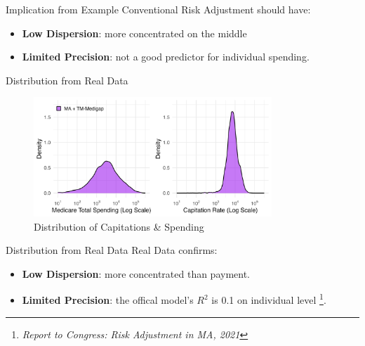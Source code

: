 \begin{frame}{Implication from Example}
    Conventional Risk Adjustment should have:
    \begin{itemize}
        \item \textbf{Low Dispersion}: more concentrated on the middle
        \item \textbf{Limited Precision}: not a good predictor for individual spending.
    \end{itemize}
\end{frame}
\begin{frame}[label=distribution]{Distribution from Real Data}
    \begin{figure}
        \centering
        \includegraphics[width=0.8\textwidth]{figures/images/capitation_spending_distribution_ungrouped.png}
        \caption{Distribution of Capitations \& Spending}
    \end{figure}
\end{frame}

\begin{frame}[label=example_end]{Distribution from Real Data}
    Real Data confirms:
    \begin{itemize}
        \item \textbf{Low Dispersion}: more concentrated than payment.
        \item \textbf{Limited Precision}: the offical model's $R^2$ is 0.1 on individual level \footnote{\textit{Report to Congress: Risk Adjustment in MA, 2021}}.
    \end{itemize}
    \vfill
    \hyperlink{source_of_incentive}{}
\end{frame}

